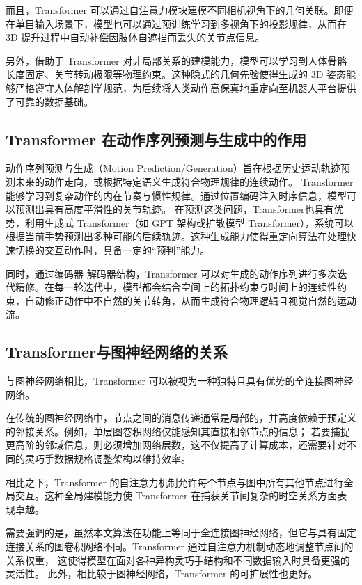 而且，Transformer 可以通过自注意力模块建模不同相机视角下的几何关联。即便在单目输入场景下，模型也可以通过预训练学习到多视角下的投影规律，从而在 3D 提升过程中自动补偿因肢体自遮挡而丢失的关节点信息。

另外，借助于 Transformer 对非局部关系的建模能力，模型可以学习到人体骨骼长度固定、关节转动极限等物理约束。这种隐式的几何先验使得生成的 3D 姿态能够严格遵守人体解剖学规范，为后续将人类动作高保真地重定向至机器人平台提供了可靠的数据基础。

\subsection{Transformer 在动作序列预测与生成中的作用}
动作序列预测与生成（Motion Prediction/Generation）旨在根据历史运动轨迹预测未来的动作走向，或根据特定语义生成符合物理规律的连续动作。
Transformer 能够学习到复杂动作的内在节奏与惯性规律。通过位置编码注入时序信息，模型可以预测出具有高度平滑性的关节轨迹。
在预测这类问题，Transformer也具有优势，利用生成式 Transformer（如 GPT 架构或扩散模型 Transformer），系统可以根据当前手势预测出多种可能的后续轨迹。这种生成能力使得重定向算法在处理快速切换的交互动作时，具备一定的“预判”能力\cite{wang_generative_2019}。

同时，通过编码器-解码器结构，Transformer 可以对生成的动作序列进行多次迭代精修。在每一轮迭代中，模型都会结合空间上的拓扑约束与时间上的连续性约束，自动修正动作中不自然的关节转角，从而生成符合物理逻辑且视觉自然的运动流。

\subsection{Transformer与图神经网络的关系}
与图神经网络相比，Transformer 可以被视为一种独特且具有优势的全连接图神经网络\cite{joshiTransformersAreGraph2025a}。

在传统的图神经网络中，节点之间的消息传递通常是局部的，并高度依赖于预定义的邻接关系\cite{feyFastGraphRepresentation2019a}。例如，单层图卷积网络仅能感知其直接相邻节点的信息；
若要捕捉更高阶的邻域信息，则必须增加网络层数，这不仅提高了计算成本，还需要针对不同的灵巧手数据规格调整架构以维持效率。

相比之下，Transformer 的自注意力机制允许每个节点与图中所有其他节点进行全局交互。这种全局建模能力使 Transformer 在捕获关节间复杂的时空关系方面表现卓越\cite{rampasekRecipeGeneralPowerful2022a}。

需要强调的是，虽然本文算法在功能上等同于全连接图神经网络，但它与具有固定连接关系的图卷积网络不同。Transformer 通过自注意力机制动态地调整节点间的关系权重，
这使得模型在面对各种异构灵巧手结构和不同数据输入时具备更强的灵活性。
此外，相比较于图神经网络，Transformer 的可扩展性也更好。
